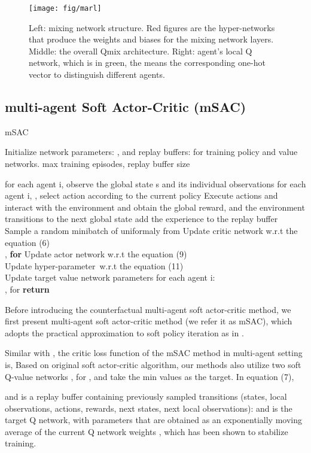 \documentclass[runningheads]{llncs}
\begin{document}
\begin{figure}[!t]
	\centering
	\texttt{[image: fig/marl]}
\caption{Left: mixing network structure. Red figures are the hyper-networks that produce the weights and biases for the mixing network layers. 
Middle: the overall Qmix architecture. 
		Right: agent's local Q network, which is in green, the  means the corresponding one-hot vector to distinguish different agents.}
\end{figure}
\subsection{multi-agent Soft Actor-Critic (mSAC)}
\begin{algorithm}[tb]
	\caption{mSAC}
	\label{alg:algorithm}
	Initialize network parameters: , 
	and replay buffers:  for training  policy and value networks. 
	max training episodes, replay buffer size 
	\begin{algorithmic}[1] \STATE for each agent i, observe the global state s and its individual observations  \;
		\STATE for each agent i, , select action  according to the current policy  
		\STATE Execute actions and interact with the environment and obtain the global reward, and the environment transitions to the next global state 
		\STATE add the experience  to the replay buffer 
		\STATE Sample a random minibatch of   uniformaly from  
		\STATE Update critic network w.r.t the equation (6) \\
		, \textbf{for} 
		\STATE Update actor network  w.r.t the equation (9) \\
		\STATE Update hyper-parameter\ w.r.t the equation (11) \\
		Update target value network parameters for each agent i:\\
		, for 
		\ENDFOR
		\ENDFOR
		\ENDFOR
		\STATE \textbf{return}   
	\end{algorithmic}
\end{algorithm} 



Before introducing the counterfactual multi-agent soft actor-critic method, 
we first present multi-agent soft actor-critic method (we refer it as mSAC), which adopts the practical approximation to soft policy iteration as in \cite{b11}.

Similar with \cite{b11}, the critic loss function of the mSAC method in multi-agent setting is,
Based on original soft actor-critic algorithm, our methods also utilize two soft Q-value networks  , for , and take the min values as the target.
In equation (7),
\begin{small}
	
\end{small}
and  is a replay buffer containing previously sampled transitions (states, local observations, actions, rewards, next states, next local observations): 
and   is the target Q network, with parameters  that are obtained as an exponentially moving average of the current Q network weights  , which has been shown to stabilize training.  
\end{document}
